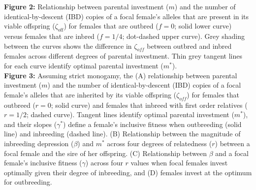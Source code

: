 \documentclass[12pt]{article}
\begin{document}
\noindent \textbf{Figure 2:} Relationship between parental investment ($m$) and the number of identical-by-descent (IBD) copies of a focal female's alleles that are present in its viable offspring ($\zeta_{\textrm{off}}$) for females that are outbred ($f=0$; solid lower curve) versus females that are inbred ($f=1/4$; dot-dashed upper curve). Grey shading between the curves shows the difference in $\zeta_{off}$ between outbred and inbred females across different degrees of parental investment. Thin grey tangent lines for each curve identify optimal parental investment ($m^{*}$). \\

\noindent \textbf{Figure 3:} Assuming strict monogamy, the (A) relationship between parental investment ($m$) and the number of identical-by-descent (IBD) copies of a focal female's alleles that are inherited by its viable offspring ($\zeta_{off}$) for females that outbreed ($r=0$; solid curve) and females that inbreed with first order relatives ($r=1/2$; dashed curve). Tangent lines identify optimal parental investment ($m^{*}$), and their slopes ($\gamma^{*}$) define a female's inclusive fitness when outbreeding (solid line) and inbreeding (dashed line). (B) Relationship between the magnitude of inbreeding depression ($\beta$) and $m^{*}$ across four degrees of relatedness ($r$) between a focal female and the sire of her offspring. (C) Relationship between $\beta$ and a focal female's inclusive fitness ($\gamma$) across four $r$ values when focal females invest optimally given their degree of inbreeding, and (D) females invest at the optimum for outbreeding. \\
\end{document}
